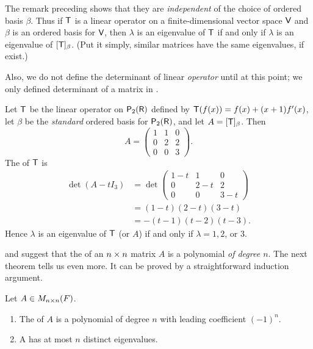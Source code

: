\begin{remark} \label{remark 5.1.7}
The remark preceding  shows that they are \emph{independent} of the choice of ordered basis \(\beta\).
Thus if \(\textsf{T}\) is a linear operator on a finite-dimensional vector space \(\textsf{V}\) and \(\beta\) is an ordered basis for \(\textsf{V}\),
then \(\lambda\) is an eigenvalue of \(\textsf{T}\) if and only if \(\lambda\) is an eigenvalue of \([\textsf{T}]_{\beta}\).
(Put it simply, similar matrices have the same eigenvalues, if exist.)

Also, we do not define the determinant of linear \emph{operator} until at this point;
we only defined determinant of a matrix in .
\end{remark}

\begin{example} \label{example 5.1.5}
Let \(\textsf{T}\) be the linear operator on \(\textsf{P}_2(\textsf{R})\) defined by \(\textsf{T}(f(x)) = f(x) + (x+1)f'(x)\),
let \(\beta\) be the \emph{standard} ordered basis for \(\textsf{P}_2(\textsf{R})\), and let \(A = [\textsf{T}]_{\beta}\).
Then
\[
    A = \begin{pmatrix} 1 & 1 & 0 \\ 0 & 2 & 2 \\ 0 & 0 & 3 \end{pmatrix}.
\]
The \CPOLY{} of \(\textsf{T}\) is
\begin{align*}
    \det(A - t I_3) & = \det \begin{pmatrix} 1 - t & 1 & 0 \\ 0 & 2 - t & 2 \\ 0 & 0 & 3 - t \end{pmatrix} \\
        & = (1 - t)(2 - t)(3 - t) \\
        & = -(t - 1)(t - 2)(t - 3).
\end{align*}
Hence \(\lambda\) is an eigenvalue of \(\textsf{T}\) (or \(A\)) if and only if \(\lambda = 1, 2\), or \(3\).
\end{example}

 and  suggest that the \CPOLY{} of an \(n \times n\) matrix \(A\) is a polynomial \emph{of degree \(n\)}.
The next theorem tells us even more.
It can be proved by a straightforward induction argument.

\begin{theorem} \label{thm 5.3}
Let \(A \in M_{n \times n}(F)\).
\begin{enumerate}
\item The \CPOLY{} of \(A\) is a polynomial of degree \(n\) with leading coefficient \((-1)^n\).
\item A has at most \(n\) distinct eigenvalues.
\end{enumerate}
\end{theorem}

